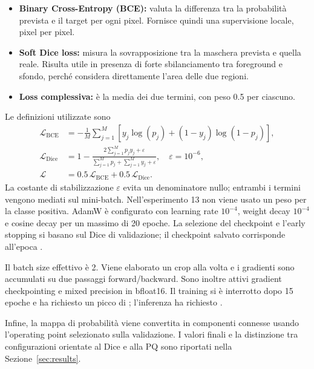 \begin{itemize}
\item \textbf{Binary Cross-Entropy (BCE):} valuta la differenza tra la probabilità
  prevista e il target per ogni pixel. Fornisce quindi una supervisione locale, pixel
  per pixel.
\item \textbf{Soft Dice loss:} misura la sovrapposizione tra la maschera prevista e
  quella reale. Risulta utile in presenza di forte sbilanciamento tra foreground e
  sfondo, perché considera direttamente l'area delle due regioni.
\item \textbf{Loss complessiva:} è la media dei due termini, con peso 0.5 per ciascuno.
\end{itemize}

Le definizioni utilizzate sono
\begin{equation}
\begin{aligned}
\mathcal{L}_{\mathrm{BCE}}
  &= -\frac{1}{M}\sum_{j=1}^{M}\left[y_j\log(p_j)+(1-y_j)\log(1-p_j)\right],\\
\mathcal{L}_{\mathrm{Dice}}
  &= 1-\frac{2\sum_{j=1}^{M}p_jy_j+\varepsilon}
  {\sum_{j=1}^{M}p_j+\sum_{j=1}^{M}y_j+\varepsilon},\quad \varepsilon=10^{-6},\\
\mathcal{L} &= 0.5\,\mathcal{L}_{\mathrm{BCE}}+0.5\,\mathcal{L}_{\mathrm{Dice}}.
\end{aligned}
\end{equation}
La costante di stabilizzazione $\varepsilon$ evita un denominatore nullo; entrambi i
termini vengono mediati sul mini-batch.
Nell'esperimento 13 non viene usato un peso per la classe positiva. AdamW è configurato
con learning rate $10^{-4}$, weight decay $10^{-4}$ e cosine decay per un massimo di 20
epoche. La selezione del checkpoint e l'early stopping si basano sul Dice di validazione;
il checkpoint salvato corrisponde all'epoca \finalepoch.

Il batch size effettivo è 2. Viene elaborato un crop alla volta e i gradienti sono
accumulati su due passaggi forward/backward. Sono inoltre attivi gradient checkpointing
e mixed precision in bfloat16. Il training si è interrotto dopo 15 epoche e ha richiesto
un picco di \finaltrainmemory{}; l'inferenza ha richiesto \finaltestmemory{}.

Infine, la mappa di probabilità viene convertita in componenti connesse usando
l'operating point selezionato sulla validazione. I valori finali e la distinzione tra
configurazioni orientate al Dice e alla PQ sono riportati nella
Sezione~\ref{sec:results}.
